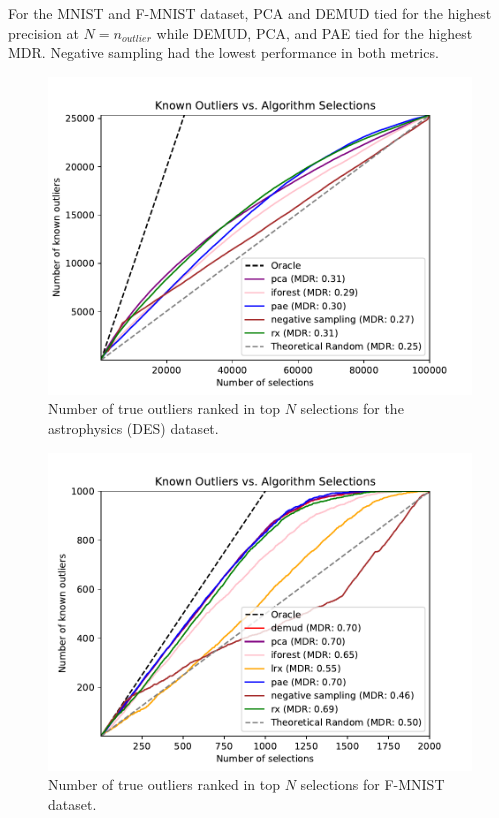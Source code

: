 \documentclass[letterpaper]{article} %
\begin{document}
For the MNIST and F-MNIST dataset, PCA and DEMUD tied for the highest
 precision at $N=n_{outlier}$
while DEMUD, PCA, and PAE tied for the highest MDR. Negative sampling had the 
lowest performance in both metrics. 

\begin{figure}
    \centering
    \includegraphics[width=\linewidth]{figures/des_combined_plot.pdf}
    \caption{Number of true outliers ranked in top $N$ selections for 
    the astrophysics (DES) dataset.}
    \label{fig:des_results}
\end{figure}

\begin{figure}
    \centering
    \includegraphics[width=\linewidth]{figures/fmnist_combined_plot.pdf}
    \caption{Number of true outliers ranked in top $N$ selections for 
    F-MNIST dataset.}
    \label{fig:fmnist_results}
\end{figure}
\end{document}
